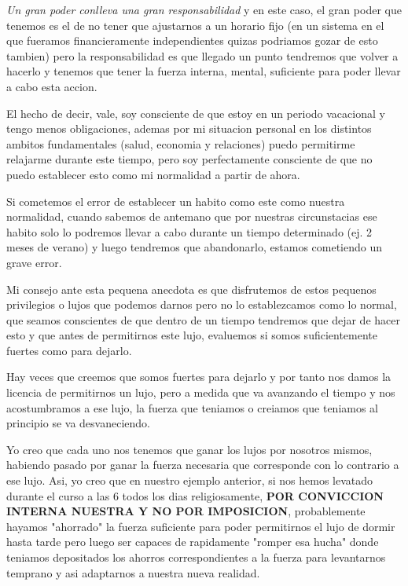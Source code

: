 \textit{Un gran poder conlleva una gran responsabilidad} y en este caso, el gran poder que tenemos es el de no tener que ajustarnos a un horario fijo (en un sistema en el que fueramos financieramente independientes quizas podriamos gozar de esto tambien) pero la responsabilidad es que llegado un punto tendremos que volver a hacerlo y tenemos que tener la fuerza interna, mental, suficiente para poder llevar a cabo esta accion.

El hecho de decir, vale, soy consciente de que estoy en un periodo vacacional y tengo menos obligaciones, ademas por mi situacion personal en los distintos ambitos fundamentales (salud, economia y relaciones) puedo permitirme relajarme durante este tiempo, pero soy perfectamente consciente de que no puedo establecer esto como mi normalidad a partir de ahora.

Si cometemos el error de establecer un habito como este como nuestra normalidad, cuando sabemos de antemano que por nuestras circunstacias ese habito solo lo podremos llevar a cabo durante un tiempo determinado (ej. 2 meses de verano) y luego tendremos que abandonarlo, estamos cometiendo un grave error. 

Mi consejo ante esta pequena anecdota es que disfrutemos de estos pequenos privilegios o lujos que podemos darnos pero no lo establezcamos como lo normal, que seamos conscientes de que dentro de un tiempo tendremos que dejar de hacer esto y que antes de permitirnos este lujo, evaluemos si somos suficientemente fuertes como para dejarlo.

Hay veces que creemos que somos fuertes para dejarlo y por tanto nos damos la licencia de permitirnos un lujo, pero a medida que va avanzando el tiempo y nos acostumbramos a ese lujo, la fuerza que teniamos o creiamos que teniamos al principio se va desvaneciendo.

Yo creo que cada uno nos tenemos que ganar los lujos por nosotros mismos, habiendo pasado por ganar la fuerza necesaria que corresponde con lo contrario a ese lujo. Asi, yo creo que en nuestro ejemplo anterior, si nos hemos levatado durante el curso a las 6 todos los dias religiosamente, \textbf{POR CONVICCION INTERNA NUESTRA Y NO POR IMPOSICION}, probablemente hayamos "ahorrado" la fuerza suficiente para poder permitirnos el lujo de dormir hasta tarde pero luego ser capaces de rapidamente "romper esa hucha" donde teniamos depositados los ahorros correspondientes a la fuerza para levantarnos temprano y asi adaptarnos a nuestra nueva realidad.

